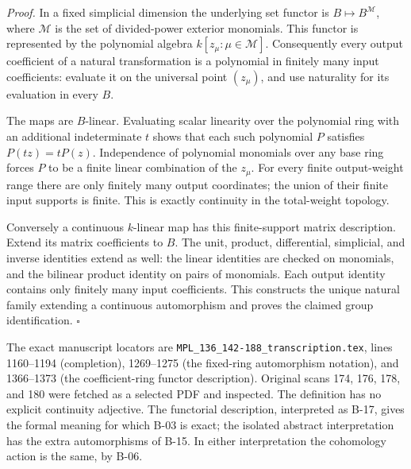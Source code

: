 \emph{Proof.}
In a fixed simplicial dimension the underlying set functor is
$B\mapsto B^{\mathcal M}$, where $\mathcal M$ is the set of
divided-power exterior monomials. This functor is represented by
the polynomial algebra $k[z_\mu:\mu\in\mathcal M]$. Consequently
every output coefficient of a natural transformation is a
polynomial in finitely many input coefficients: evaluate it on the
universal point $(z_\mu)$, and use naturality for its evaluation in
every $B$.

The maps are $B$-linear. Evaluating scalar linearity over the
polynomial ring with an additional indeterminate $t$ shows that
each such polynomial $P$ satisfies $P(tz)=tP(z)$. Independence of
polynomial monomials over any base ring forces $P$ to be a finite
linear combination of the $z_\mu$. For every finite output-weight
range there are only finitely many output coordinates; the union
of their finite input supports is finite. This is exactly
continuity in the total-weight topology.

Conversely a continuous $k$-linear map has this finite-support
matrix description. Extend its matrix coefficients to $B$.
The unit, product, differential, simplicial, and inverse identities
extend as well: the linear identities are checked on monomials,
and the bilinear product identity on pairs of monomials. Each
output identity contains only finitely many input coefficients.
This constructs the unique natural family extending a continuous
automorphism and proves the claimed group identification.
\hfill$\square$

The exact manuscript locators are
\texttt{MPL\_136\_142-188\_transcription.tex}, lines 1160--1194
(completion), 1269--1275 (the fixed-ring automorphism notation),
and 1366--1373 (the coefficient-ring functor description).
Original scans 174, 176, 178, and 180 were fetched as a selected
PDF and inspected. The definition has no explicit continuity
adjective. The functorial description, interpreted as B-17, gives
the formal meaning for which B-03 is exact; the isolated abstract
interpretation has the extra automorphisms of B-15. In either
interpretation the cohomology action is the same, by B-06.
